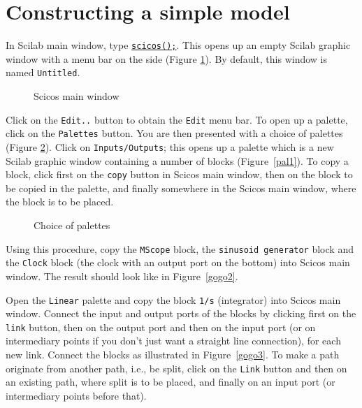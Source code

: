 \documentclass{book}
\begin{document}
\section{Constructing a simple model}
In Scilab main window, type \underline{{\tt scicos();}}. This opens up an empty Scilab graphic
window with a menu bar on the side (Figure \ref{fig0}). By default, this window is
named {\tt Untitled}. 
  \begin{figure}[hbtp]
  \centerline{}
  \caption{Scicos main window}
 \label{fig0}
  \end{figure}

Click on the {\tt Edit..} button to obtain the {\tt Edit} menu bar.
To open up a palette, click on the {\tt Palettes} button. 
You are then presented with a choice of palettes (Figure \ref{choice1}).
Click on {\tt Inputs/Outputs}; this opens up a palette which is a
new Scilab graphic window containing
a number of blocks (Figure~\ref{pal1}). To copy a block, click first on the {\tt copy}
button in Scicos main window, then on the block to be copied in the
palette, and finally somewhere
in the Scicos main window, where the block is to be placed. 
  \begin{figure}[hbtp]
  \centerline{}
  \caption{Choice of palettes}
 \label{choice1}
  \end{figure}



Using this procedure, copy the {\tt MScope} block, 
the {\tt sinusoid generator} block and the
{\tt Clock} block (the clock with an output port on the bottom) 
into Scicos main window.
The result should look like in Figure~\ref{gogo2}.


Open the {\tt Linear} palette and copy the block {\tt 1/s} (integrator) into
Scicos main window. Connect the input and output ports of the blocks
by clicking first on the {\tt link} button, then on the output port and then on the
input port (or on intermediary points if you don't just want 
a straight line connection), for each new link.
Connect the blocks as illustrated in Figure~\ref{gogo3}. To make a path originate 
from another path, i.e., be split, click
on the {\tt Link} button and then on an existing path, where split is
to be placed, and finally on an input port (or intermediary points
before that). 



\end{document}
